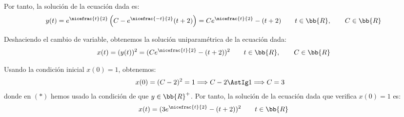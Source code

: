 \begin{ejercicio}
    Por tanto, la solución de la ecuación dada es:
    \begin{equation*}
        y(t) = e^{\nicefrac{t}{2}}\left(C-e^{\nicefrac{-t}{2}}(t+2)\right) = Ce^{\nicefrac{t}{2}} - (t+2) \qquad t\in \bb{R}, \qquad C\in \bb{R}
    \end{equation*}

    Deshaciendo el cambio de variable, obtenemos la solución uniparamétrica de la ecuación dada:
    \begin{equation*}
        x(t) = (y(t))^2 = (Ce^{\nicefrac{t}{2}} - (t+2))^2 \qquad t\in \bb{R}, \qquad C\in \bb{R}
    \end{equation*}

    Usando la condición inicial $x(0)=1$, obtenemos:
    \begin{align*}
        x(0) &= (C-2)^2 = 1 \Longrightarrow C-2 \AstIg 1 \Longrightarrow C=3
    \end{align*}
    donde en $(\ast)$ hemos usado la condición de que $y\in \bb{R}^+$.
    Por tanto, la solución de la ecuación dada que verifica $x(0)=1$ es:
    \begin{equation*}
        x(t) = (3e^{\nicefrac{t}{2}} - (t+2))^2 \qquad t\in \bb{R}
    \end{equation*}
\end{ejercicio}


